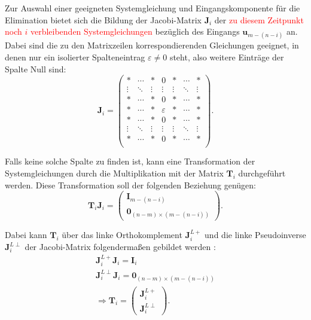 Zur Auswahl einer geeigneten Systemgleichung und Eingangskomponente für die Elimination bietet sich die Bildung der Jacobi-Matrix $\mathbf{J}_i$ der  \textcolor{red}{zu diesem Zeitpunkt noch $i$ verbleibenden Systemgleichungen} bezüglich des Eingangs $\mathbf{u}_{m-(n-i)}$ an. Dabei sind die zu den Matrixzeilen korrespondierenden Gleichungen geeignet, in denen nur ein isolierter Spalteneintrag $\varepsilon \neq 0$ steht, also weitere Einträge der Spalte Null sind:
\begin{equation}
	\mathbf{J}_i = 
	\begin{pmatrix}
	* & \cdots & * & 0 & * & \cdots & *\\
	\vdots & \ddots & \vdots & \vdots & \vdots & \ddots & \vdots \\
	* & \cdots & * & 0 & * & \cdots & *  \\
	* & \cdots & * & \varepsilon & * & \cdots & * \\
	* & \cdots & * & 0 & * & \cdots & *  \\
	\vdots & \ddots & \vdots & \vdots & \vdots & \ddots & \vdots \\
	* & \cdots & * & 0 & * & \cdots & *\\
	\end{pmatrix}.
\end{equation}

Falls keine solche Spalte zu finden ist, kann eine Transformation der Systemgleichungen durch die Multiplikation mit der Matrix $\mathbf{T}_i$ durchgeführt werden. Diese Transformation soll der folgenden Beziehung genügen:
\begin{equation}
	\mathbf{T}_i \mathbf{J}_i = 
	\begin{pmatrix}
		\mathbf{I}_{m-(n-i)} \\
		\mathbf{0}_{(n-m) \times (m-(n-i))}
	\end{pmatrix}.
\end{equation}

Dabei kann $\mathbf{T}_i$ über das linke Orthokomplement $\mathbf{J}_i^{L +}$ und die linke Pseudoinverse $\mathbf{J}_i^{L \perp}$ der Jacobi-Matrix folgendermaßen gebildet werden \cite[Abschnitt 2.1.2]{Fritzsche2016}:
\begin{align}
	\mathbf{J}_i^{L +} \mathbf{J}_i = \mathbf{I}_i \\
	\mathbf{J}_i^{L \perp} \mathbf{J}_i = \mathbf{0}_{(n-m) \times (m-(n-i))} \\
	\Rightarrow \mathbf{T}_i = 
	\begin{pmatrix}
		\mathbf{J}_i^{L +} \\
		\mathbf{J}_i^{L \perp}
	\end{pmatrix} .
\end{align}

